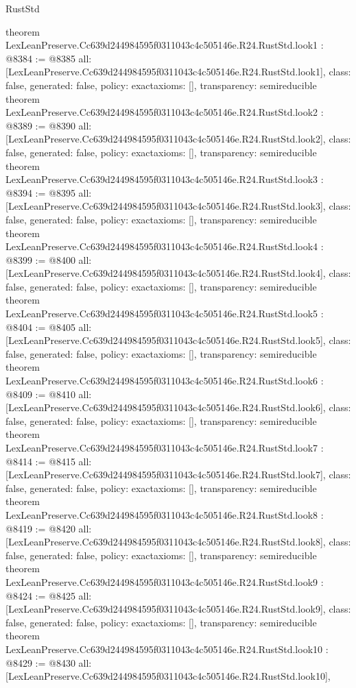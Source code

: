 \begin{lexlean}{RustStd}
\begin{coremodule}
{}
theorem LexLeanPreserve.Cc639d244984595f0311043c4c505146e.R24.RustStd.look1 : @8384 := @8385 {
  all: [LexLeanPreserve.Cc639d244984595f0311043c4c505146e.R24.RustStd.look1],
  class: false,
  generated: false,
  policy: exact{axioms: []},
  transparency: semireducible
}
theorem LexLeanPreserve.Cc639d244984595f0311043c4c505146e.R24.RustStd.look2 : @8389 := @8390 {
  all: [LexLeanPreserve.Cc639d244984595f0311043c4c505146e.R24.RustStd.look2],
  class: false,
  generated: false,
  policy: exact{axioms: []},
  transparency: semireducible
}
theorem LexLeanPreserve.Cc639d244984595f0311043c4c505146e.R24.RustStd.look3 : @8394 := @8395 {
  all: [LexLeanPreserve.Cc639d244984595f0311043c4c505146e.R24.RustStd.look3],
  class: false,
  generated: false,
  policy: exact{axioms: []},
  transparency: semireducible
}
theorem LexLeanPreserve.Cc639d244984595f0311043c4c505146e.R24.RustStd.look4 : @8399 := @8400 {
  all: [LexLeanPreserve.Cc639d244984595f0311043c4c505146e.R24.RustStd.look4],
  class: false,
  generated: false,
  policy: exact{axioms: []},
  transparency: semireducible
}
theorem LexLeanPreserve.Cc639d244984595f0311043c4c505146e.R24.RustStd.look5 : @8404 := @8405 {
  all: [LexLeanPreserve.Cc639d244984595f0311043c4c505146e.R24.RustStd.look5],
  class: false,
  generated: false,
  policy: exact{axioms: []},
  transparency: semireducible
}
theorem LexLeanPreserve.Cc639d244984595f0311043c4c505146e.R24.RustStd.look6 : @8409 := @8410 {
  all: [LexLeanPreserve.Cc639d244984595f0311043c4c505146e.R24.RustStd.look6],
  class: false,
  generated: false,
  policy: exact{axioms: []},
  transparency: semireducible
}
theorem LexLeanPreserve.Cc639d244984595f0311043c4c505146e.R24.RustStd.look7 : @8414 := @8415 {
  all: [LexLeanPreserve.Cc639d244984595f0311043c4c505146e.R24.RustStd.look7],
  class: false,
  generated: false,
  policy: exact{axioms: []},
  transparency: semireducible
}
theorem LexLeanPreserve.Cc639d244984595f0311043c4c505146e.R24.RustStd.look8 : @8419 := @8420 {
  all: [LexLeanPreserve.Cc639d244984595f0311043c4c505146e.R24.RustStd.look8],
  class: false,
  generated: false,
  policy: exact{axioms: []},
  transparency: semireducible
}
theorem LexLeanPreserve.Cc639d244984595f0311043c4c505146e.R24.RustStd.look9 : @8424 := @8425 {
  all: [LexLeanPreserve.Cc639d244984595f0311043c4c505146e.R24.RustStd.look9],
  class: false,
  generated: false,
  policy: exact{axioms: []},
  transparency: semireducible
}
theorem LexLeanPreserve.Cc639d244984595f0311043c4c505146e.R24.RustStd.look10 : @8429 := @8430 {
  all: [LexLeanPreserve.Cc639d244984595f0311043c4c505146e.R24.RustStd.look10],
}
\end{coremodule}
\end{lexlean}
